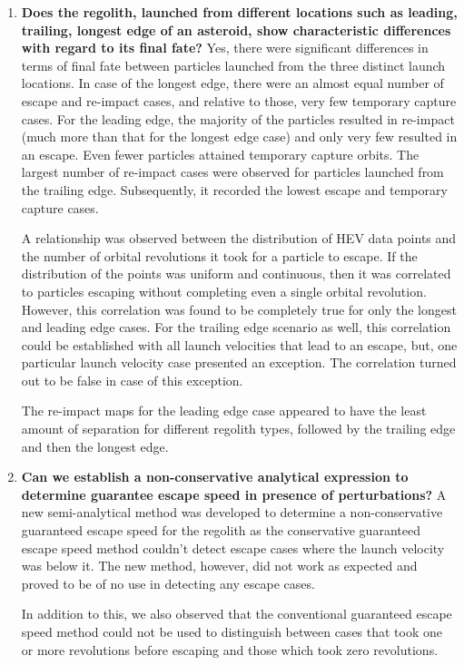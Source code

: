 \begin{enumerate}
\item \textbf{Does the regolith, launched from different locations such as leading, trailing, longest edge of an asteroid, show characteristic differences with regard to its final fate?} \newline
Yes, there were significant differences in terms of final fate between particles launched from the three distinct launch locations. In case of the longest edge, there were an almost equal number of escape and re-impact cases, and relative to those, very few temporary capture cases. For the leading edge, the majority of the particles resulted in re-impact (much more than that for the longest edge case) and only very few resulted in an escape. Even fewer particles attained temporary capture orbits. The largest number of re-impact cases were observed for particles launched from the trailing edge. Subsequently, it recorded the lowest escape and temporary capture cases.

A relationship was observed between the distribution of \gls{HEV} data points and the number of orbital revolutions it took for a particle to escape. If the distribution of the points was uniform and continuous, then it was correlated to particles escaping without completing even a single orbital revolution. However, this correlation was found to be completely true for only the longest and leading edge cases. For the trailing edge scenario as well, this correlation could be established with all launch velocities that lead to an escape, but, one particular launch velocity case presented an exception. The correlation turned out to be false in case of this exception.

The re-impact maps for the leading edge case appeared to have the least amount of separation for different regolith types, followed by the trailing edge and then the longest edge.

\item \textbf{Can we establish a non-conservative analytical expression to determine guarantee escape speed in presence of perturbations?}\newline
A new semi-analytical method was developed to determine a non-conservative guaranteed escape speed for the regolith as the conservative guaranteed escape speed method couldn't detect escape cases where the launch velocity was below it. The new method, however, did not work as expected and proved to be of no use in detecting any escape cases.

In addition to this, we also observed that the conventional guaranteed escape speed method could not be used to distinguish between cases that took one or more revolutions before escaping and those which took zero revolutions.


\end{enumerate}
